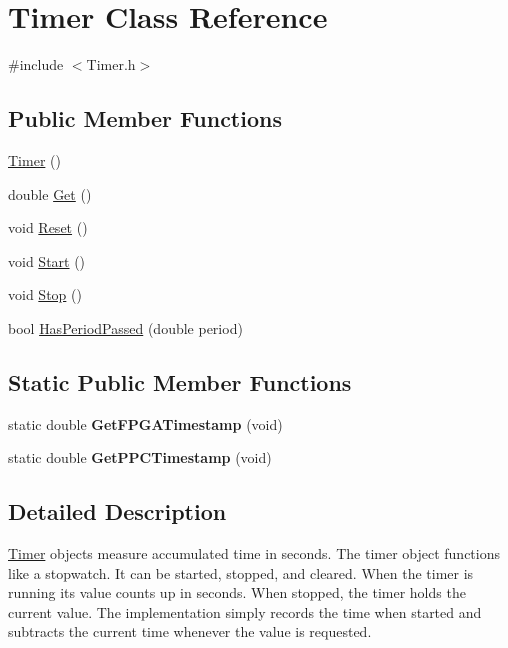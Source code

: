 \hypertarget{classTimer}{\section{\-Timer \-Class \-Reference}
\label{classTimer}
}


{\ttfamily \#include $<$\-Timer.\-h$>$}

\subsection*{\-Public \-Member \-Functions}
\begin{DoxyCompactItemize}
\item 
\hyperlink{classTimer_a5f16e8da27d2a5a5242dead46de05d97}{\-Timer} ()
\item 
double \hyperlink{classTimer_aadc180bcac64bc164f134d9c8076e1a3}{\-Get} ()
\item 
void \hyperlink{classTimer_ae7c0c1e7d12de4b8a6e7c64e451cdd2a}{\-Reset} ()
\item 
void \hyperlink{classTimer_a4e607b129b392c11adddd9641a320436}{\-Start} ()
\item 
void \hyperlink{classTimer_a6379e797f968aaee6ac3bb12dc6b81c5}{\-Stop} ()
\item 
bool \hyperlink{classTimer_a044e56cf40905d2f5037745e44cc3881}{\-Has\-Period\-Passed} (double period)
\end{DoxyCompactItemize}
\subsection*{\-Static \-Public \-Member \-Functions}
\begin{DoxyCompactItemize}
\item 
\hypertarget{classTimer_af5869805a98a766621ac340488b04543}{static double {\bfseries \-Get\-F\-P\-G\-A\-Timestamp} (void)}\label{classTimer_af5869805a98a766621ac340488b04543}

\item 
\hypertarget{classTimer_aff30b0b97a5426b2e43d424e03d81dc2}{static double {\bfseries \-Get\-P\-P\-C\-Timestamp} (void)}\label{classTimer_aff30b0b97a5426b2e43d424e03d81dc2}

\end{DoxyCompactItemize}


\subsection{\-Detailed \-Description}
\hyperlink{classTimer}{\-Timer} objects measure accumulated time in seconds. \-The timer object functions like a stopwatch. \-It can be started, stopped, and cleared. \-When the timer is running its value counts up in seconds. \-When stopped, the timer holds the current value. \-The implementation simply records the time when started and subtracts the current time whenever the value is requested. 

